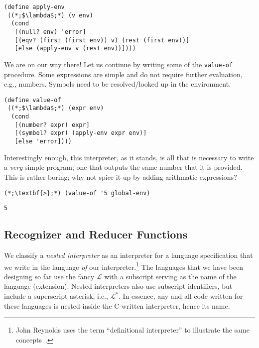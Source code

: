 \begin{cl}[]{}\begin{lstlisting}[language=MyScheme]
(define apply-env
 ((*;$\lambda$;*) (v env)
  (cond
   [(null? env) 'error]
   [(eqv? (first (first env)) v) (rest (first env))]
   [else (apply-env v (rest env))])))
\end{lstlisting}\end{cl}

We are on our way there! Let us continue by writing some of the \texttt{value-of} procedure. Some expressions are simple and do not require further evaluation, e.g., numbers. Symbols need to be resolved/looked up in the environment.

\begin{cl}[]{}\begin{lstlisting}[language=MyScheme]
(define value-of
 ((*;$\lambda$;*) (expr env)
  (cond
   [(number? expr) expr]
   [(symbol? expr) (apply-env expr env)]
   [else 'error])))
\end{lstlisting}\end{cl}
Interestingly enough, this interpreter, as it stands, is all that is necessary to write a \textit{very} simple program; one that outputs the same number that it is provided. This is rather boring; why not spice it up by adding arithmatic expressions?
\begin{cloast}[]{}\begin{lstlisting}[language=MyScheme]
(*;\textbf{>};*) (value-of '5 global-env)
\end{lstlisting}
\tcblower
\begin{lstlisting}[language=MyOutput]
5
\end{lstlisting}
\end{cloast}

\subsection*{Recognizer and Reducer Functions}
We classify a \textit{nested interpreter} as an interpreter for a language specification that we write in the language \textit{of} our interpreter.\footnote{John Reynolds uses the term ``definitional interpreter'' to illustrate the same concepts~\cite{defint}.} The languages that we have been designing so far use the fancy $\mathcal{L}$ with a subscript serving as the name of the language (extension). Nested interpreters also use subscript identifiers, but include a superscript asterisk, i.e., $\mathcal{L}^{*}$. In essence, any and all code written for these languages is nested inside the C-written interpreter, hence its name.  

